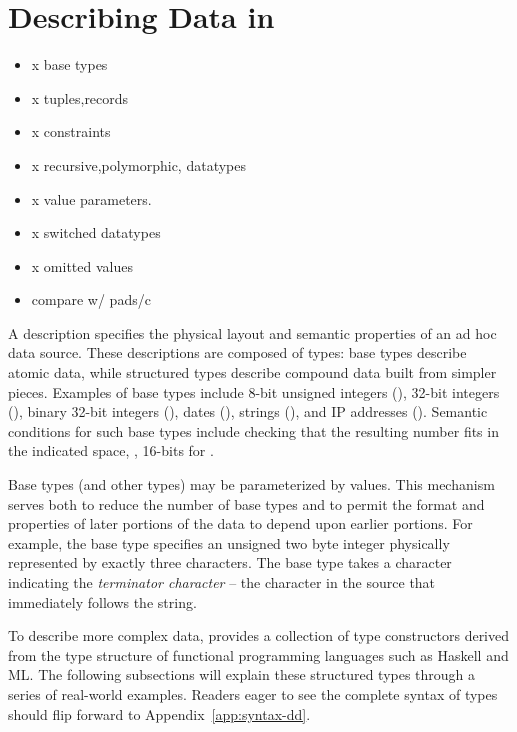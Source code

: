 \newcommand{\pvalue}{???}
\section{Describing Data in \padsmlbig{}}
\label{sec:padsml-overview}

\begin{itemize}
\item x base types
\item x tuples,records
\item x constraints
\item x recursive,polymorphic, datatypes
\item x value parameters.
\item x switched datatypes
\item x omitted values
\item compare w/ pads/c
\end{itemize}

A \padsml{} description specifies the physical layout and semantic
properties of an ad hoc data source.  
These descriptions are composed of types: 
base types describe atomic data, while structured
types describe compound data built from simpler pieces.  Examples of
base types include 8-bit unsigned integers (), 32-bit
integers (), binary 32-bit integers (), dates
(), strings (), and IP addresses ().
Semantic conditions for such base types include checking that the
resulting number fits in the indicated space, \ie, 16-bits for
.

Base types (and other types) may be parameterized by values.  This
mechanism serves both to reduce the number of base types and to permit
the format and properties of later portions of the data to depend upon
earlier portions.  For example, the base type 
specifies an unsigned two byte integer physically represented by
exactly three characters. The base type  takes 
a character indicating the \textit{terminator character} -- the character in the
source that immediately follows the string. 

To describe more complex data, \padsml{} provides a collection of
type constructors derived from the type structure of functional
programming languages such as Haskell and ML.  The following
subsections will explain these structured types through a series 
of real-world examples.  Readers eager to see the complete syntax
of types should flip forward to Appendix~\ref{app:syntax-dd}.

